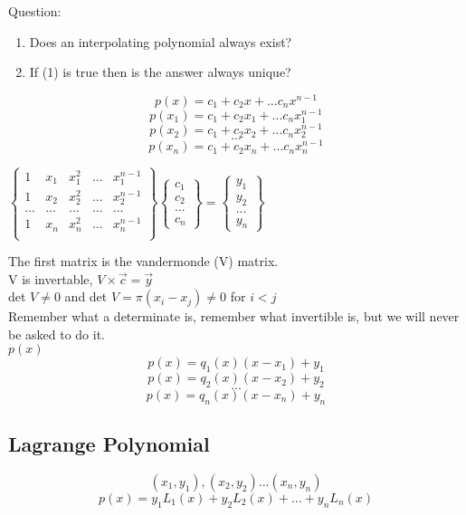 \documentclass[12pt]{article}
\begin{document}
	Question:\\
	\begin{enumerate}
		\item Does an interpolating polynomial always exist?
		\item If (1) is true then is the answer always unique?
	\end{enumerate}

	$$p(x) = c_1 + c_2x + ... c_nx^{n-1}$$
	$$p(x_1) = c_1 + c_2x_1 + ... c_nx_1^{n-1}$$
	$$p(x_2) = c_1 + c_2x_2 + ... c_nx_2^{n-1}$$
	$$...$$
	$$p(x_n) = c_1 + c_2x_n + ... c_nx_n^{n-1}$$
	
	$
	\begin{Bmatrix}
		1 & x_1 & x_1^2 & ... & x_1^{n-1} \\
		1 & x_2 & x_2^2 & ... & x_2^{n-1} \\
		... & ... & ... & ... & ... \\
		1 & x_n & x_n^2 & ... & x_n^{n-1} \\
	\end{Bmatrix}
	\begin{Bmatrix}
		c_1 \\ c_2 \\ ... \\ c_n
	\end{Bmatrix}
	 = 
	 \begin{Bmatrix}
		 y_1 \\ y_2 \\ ... \\ y_n
	 \end{Bmatrix}
	$
	
	The first matrix is the vandermonde (V) matrix.\\
	V is invertable, $V \times \overrightarrow{c} = \overrightarrow{y}$\\
	det $V \ne 0$ and det $V = \pi(x_i - x_j) \ne 0$ for $i < j$\\
	
	Remember what a determinate is, remember what invertible is, but we will never be asked to do it.\\
	
	$p(x)$
	$$p(x) = q_1(x)(x-x_1) + y_1$$
	$$p(x) = q_2(x)(x-x_2) + y_2$$
	$$...$$
	$$p(x) = q_n(x)(x-x_n) + y_n$$
	
	\subsection*{Lagrange Polynomial}
	
	$$(x_1, y_1), (x_2,y_2)...(x_n,y_n)$$
	$$p(x) = y_1L_1(x) + y_2L_2(x) + ... + y_nL_n(x)$$
	
\end{document}
